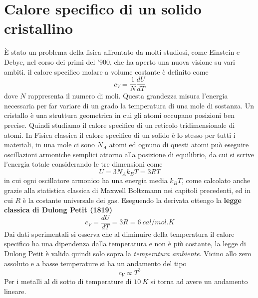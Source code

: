 

\section{Calore specifico di un solido cristallino}
È stato un problema della fisica affrontato da molti studiosi, come Einstein e Debye, nel corso dei primi del '900, che ha aperto una nuova visione su vari ambiti.
il calore specifico molare a volume costante è definito come
\begin{equation}
c_V = \frac{1}{N} \frac{dU}{dT}
\end{equation}
dove $N$ rappresenta il numero di moli.
Questa grandezza misura l'energia necessaria per far variare di un grado la temperatura di una mole di sostanza.
Un cristallo è una struttura geometrica in cui gli atomi occupano posizioni ben precise.
Quindi studiamo il calore specifico di un reticolo tridimensionale di atomi.
In Fisica classica il calore specifico di un solido è lo stesso per tutti i materiali, in una mole ci sono $N_A$ atomi ed ognuno di questi atomi può eseguire oscillazioni armoniche semplici attorno alla posizione di equilibrio, da cui si scrive l'energia totale considerando le tre dimensioni come
\begin{equation}
U = 3 N_A k_B T = 3 R T
\end{equation}
in cui ogni oscillatore armonico ha una energia media $k_B T$, come calcolato anche grazie alla statistica classica di Maxwell Boltzmann nei capitoli precedenti, 
ed in cui $R$ è la costante universale dei gas.
Eseguendo la derivata ottengo la \textbf{legge classica di Dulong Petit (1819)}
\begin{equation}
c_V = \frac{dU}{dT} = 3 R = \SI{6}{cal / mol . K}
\end{equation}
Dai dati sperimentali si osserva che al diminuire della temperatura il calore specifico ha una dipendenza dalla temperatura e non è più costante, la legge di Dulong Petit è valida quindi solo sopra la \textit{temperatura ambiente}.
Vicino allo zero assoluto e a basse temperature si ha un andamento del tipo
\begin{equation}
c_V \propto T^3
\end{equation}
Per i metalli al di sotto di temperature di $\SI{10}{K}$ si torna ad avere un andamento lineare. \\


